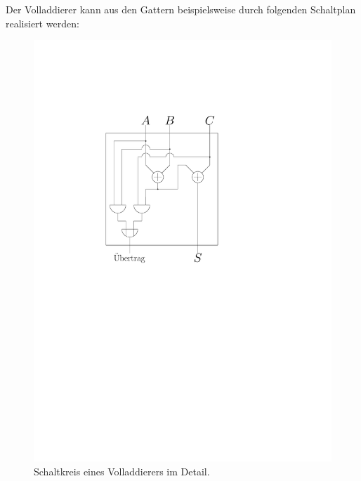 \noindent Der Volladdierer kann aus den Gattern beispielsweise durch folgenden 
Schaltplan realisiert werden: 
\\
\begin{figure}[h]
\centering
\includegraphics[scale=0.8]{bilder/Volladdierer_Detail.pdf}
\caption{Schaltkreis eines Volladdierers im Detail.}
\end{figure}

